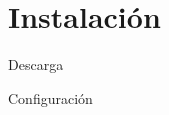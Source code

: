 
\section{Instalación}

	\begin{frame}{Descarga}

	\end{frame}


	\begin{frame}{Configuración}
        
	\end{frame}
